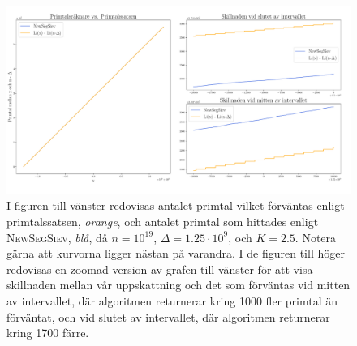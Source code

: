 \begin{figure}[H]
    \centering
    \includegraphics[width = \textwidth]{coen/Images/Primes.pdf}
    \caption{I figuren till vänster redovisas antalet primtal vilket förväntas enligt primtalssatsen, \textit{orange}, och antalet primtal som hittades enligt \textsc{NewSegSiev}, \textit{blå}, då \(n = 10^{19}\), \(\Delta = 1.25\cdot10^{9}\), och \(K = 2.5\). 
    Notera gärna att kurvorna ligger nästan på varandra. 
    I de figuren till höger redovisas en zoomad version av grafen till vänster för att visa skillnaden mellan vår uppskattning och det som förväntas vid mitten av intervallet, där algoritmen returnerar kring 1000 fler primtal än förväntat, och vid slutet av intervallet, där algoritmen returnerar kring 1700 färre.}
    \label{fig:res.prime}
\end{figure}

